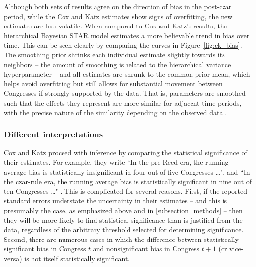 Although both sets of results agree on the direction of bias in the post-czar period, 
while the Cox and Katz estimates show signs of overfitting, the new estimates are less volatile. 
When compared to Cox and Katz's results, the hierarchical Bayesian STAR model estimates 
a more believable trend in bias over time. This can be seen clearly by comparing the curves 
in Figure~\ref{fig:ck_bias}. The smoothing prior shrinks each individual estimate slightly 
towards its neighbors -- the amount of smoothing is related to the hierarchical variance 
hyperparameter -- and all estimates are shrunk to the common prior mean, which helps 
avoid overfitting but still allows for substantial movement between Congresses 
if strongly supported by the data. That is, parameters are smoothed such that the effects 
they represent are more similar for adjacent time periods, with the precise nature of the 
similarity depending on the observed data 
. 



\subsubsection{Different interpretations}

Cox and Katz proceed with inference by comparing the statistical significance of their 
estimates. For example, they write ``In the pre-Reed era, the running average 
bias is statistically insignificant in four out of five Congresses \dots", and ``In the czar-rule era, 
the running average bias is statistically significant in nine out of ten Congresses \dots" 
. This is complicated for several reasons.
First, if the reported standard errors understate the uncertainty in their estimates 
-- and this is presumably the case, as emphasized above and in \ref{subsection_methods} 
-- then they will be more likely to find statistical significance than is justified from the data, 
regardless of the arbitrary threshold selected for determining significance. Second, there
are numerous cases in which the difference between statistically significant bias in Congress 
$t$ and nonsignificant bias in Congress $t + 1$ (or vice-versa) is not itself statistically significant. 

